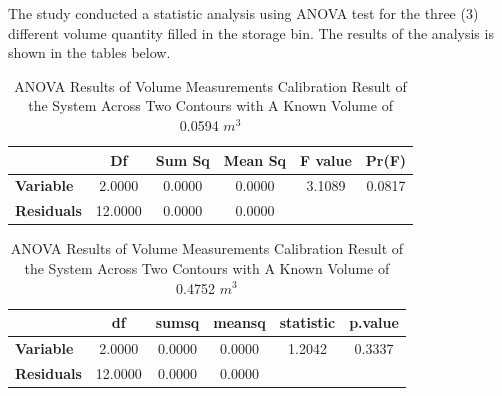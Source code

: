 \begin{enumerate}



	      The study conducted a statistic analysis using ANOVA test for the three (3) different volume quantity filled in the storage bin. The results of the analysis is shown in the tables below.

	      \begin{table}[H]
		      \centering
		      \caption{ANOVA Results of Volume Measurements Calibration Result of the System Across Two Contours with A Known Volume of 0.0594 $m^3$}
		      \label{table:anova-1}
		      \begin{tabular}{@{}lccccc@{}}
			      \toprule
			                         & \textbf{Df} & \textbf{Sum Sq} & \textbf{Mean Sq} & \textbf{F value} & \textbf{Pr(\>F)} \\ \midrule
			      \textbf{Variable}  & 2.0000      & 0.0000          & 0.0000           & 3.1089           & 0.0817           \\
			      \textbf{Residuals} & 12.0000     & 0.0000          & 0.0000           &                  &                  \\ \bottomrule
		      \end{tabular}%
	      \end{table}

	      \begin{table}[H]
		      \centering
		      \caption{ANOVA Results of Volume Measurements Calibration Result of the System Across Two Contours with A Known Volume of 0.4752 $m^3$}
		      \label{table:anova-2}
		      \begin{tabular}{@{}lccccc@{}}
			      \toprule
			                         & \textbf{df} & \textbf{sumsq} & \textbf{meansq} & \textbf{statistic} & \textbf{p.value} \\ \midrule
			      \textbf{Variable}  & 2.0000      & 0.0000         & 0.0000          & 1.2042             & 0.3337           \\
			      \textbf{Residuals} & 12.0000     & 0.0000         & 0.0000          &                    &                  \\ \bottomrule
		      \end{tabular}%
	      \end{table}


\end{enumerate}

